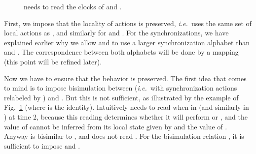 \documentclass{LMCS}
\theoremstyle{plain}\newtheorem*{prop11}{Proposition~\ref{prop:states} bis}
\def\ie{{\em i.e.\ }}
\begin{document}
\begin{figure}[t]
  \caption{ needs to read the clocks of  and
  . \label{fig:bisim}}
\end{figure}

First, we impose that the locality of actions is preserved, \ie  uses
the same set of local actions as , and similarly for  and
. For the synchronizations, we have explained earlier why we allow
 and  to use a larger synchronization alphabet than  and
. The correspondence between both alphabets will be done by a mapping
 (this point will be refined later).

Now we have to ensure that the behavior is preserved. The first idea that comes
to mind is to impose bisimulation between 
(\ie  with synchronization actions relabeled by
) and . But this is not sufficient, as illustrated by
the example of Fig.~\ref{fig:bisim} (where  is the identity).
Intuitively  needs to read  when in  (and similarly in
) at time 2, because this reading determines whether it will
perform  or , and the value of  cannot be inferred from its local
state given by  and the value of . Anyway 
is bisimilar to , and  does not read .
For the bisimulation relation , it is sufficient to impose
 and
.
\end{document}
